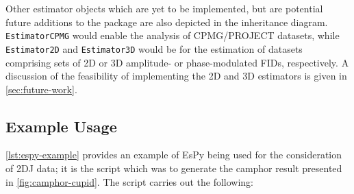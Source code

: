 Other estimator objects which are yet to be implemented, but are potential
future additions to the package are also depicted in the inheritance diagram.
\texttt{EstimatorCPMG} would enable the analysis of \ac{CPMG}/\ac{PROJECT} datasets,
while \texttt{Estimator2D} and \texttt{Estimator3D} would be
for the estimation of datasets comprising sets of \ac{2D} or \ac{3D} amplitude-
or phase-modulated \acp{FID}, respectively. A discussion of the feasibility of
implementing the \ac{2D} and \ac{3D} estimators is given in
\cref{sec:future-work}.

\subsection{Example Usage}
\cref{lst:espy-example} provides an example of \ac{EsPy} being used for the
consideration of \ac{2DJ} data; it is the script which was to generate the
camphor result presented in \cref{fig:camphor-cupid}.
The script carries out the following:
